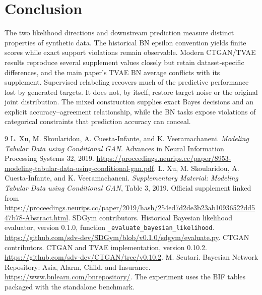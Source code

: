 \documentclass[11pt,letterpaper]{article}
\begin{document}
\section{Conclusion}
The two likelihood directions and downstream prediction measure distinct properties of synthetic data. The historical BN epsilon convention yields finite scores while exact support violations remain observable. Modern CTGAN/TVAE results reproduce several supplement values closely but retain dataset-specific differences, and the main paper's TVAE BN average conflicts with its supplement. Supervised relabeling recovers much of the predictive performance lost by generated targets. It does not, by itself, restore target noise or the original joint distribution. The mixed construction supplies exact Bayes decisions and an explicit accuracy--agreement relationship, while the BN tasks expose violations of categorical constraints that prediction accuracy can conceal.

\begin{thebibliography}{9}
 L. Xu, M. Skoularidou, A. Cuesta-Infante, and K. Veeramachaneni. \emph{Modeling Tabular Data using Conditional GAN}. Advances in Neural Information Processing Systems 32, 2019. \url{https://proceedings.neurips.cc/paper/8953-modeling-tabular-data-using-conditional-gan.pdf}.
 L. Xu, M. Skoularidou, A. Cuesta-Infante, and K. Veeramachaneni. \emph{Supplementary Material: Modeling Tabular Data using Conditional GAN}, Table 3, 2019. Official supplement linked from \url{https://proceedings.neurips.cc/paper/2019/hash/254ed7d2de3b23ab10936522dd547b78-Abstract.html}.
 SDGym contributors. Historical Bayesian likelihood evaluator, version 0.1.0, function \texttt{\_evaluate\_bayesian\_likelihood}. \url{https://github.com/sdv-dev/SDGym/blob/v0.1.0/sdgym/evaluate.py}.
 CTGAN contributors. CTGAN and TVAE implementation, version 0.10.2. \url{https://github.com/sdv-dev/CTGAN/tree/v0.10.2}.
 M. Scutari. Bayesian Network Repository: Asia, Alarm, Child, and Insurance. \url{https://www.bnlearn.com/bnrepository/}. The experiment uses the BIF tables packaged with the standalone benchmark.
\end{thebibliography}

\clearpage
\appendix
\end{document}
